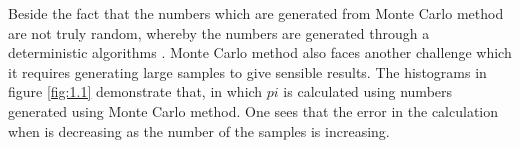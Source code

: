 Beside the fact that the numbers which are generated from Monte Carlo method  are not truly random, whereby the numbers are generated through a deterministic algorithms  \citep{montecarlo}.
Monte Carlo method also faces another challenge which it requires generating large samples to give sensible results. The histograms in figure \ref{fig:1.1} demonstrate that, in which $pi$ is calculated using numbers generated using Monte Carlo method.    
One sees that the error in the calculation when is decreasing as the number of the samples is increasing.



 





